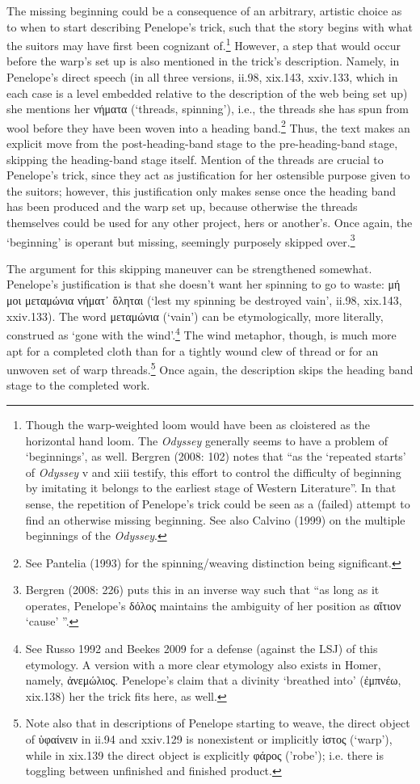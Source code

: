\documentclass[12pt]{article}
\begin{document}
The missing beginning could be a consequence of an arbitrary, artistic choice as to when to start describing Penelope's trick, such that the story begins with what the suitors may have first been cognizant of.\footnote{ Though the warp-weighted loom would have been as cloistered as the horizontal hand loom. The \textit{Odyssey} generally seems to have a problem of `beginnings', as well. Bergren (2008: 102) notes that ``as the `repeated starts' of \textit{Odyssey} v and xiii testify, this effort to control the difficulty of beginning by imitating it belongs to the earliest stage of Western Literature''. In that sense, the repetition of Penelope's trick could be seen as a (failed) attempt to find an otherwise missing beginning. See also Calvino (1999) on the multiple beginnings of the \textit{Odyssey}.} However, a step that would occur before the warp's set up is also mentioned in the trick's description. Namely, in Penelope's direct speech (in all three versions, ii.98, xix.143, xxiv.133, which in each case is a level embedded relative to the description of the web being set up) she mentions her νήματα (`threads, spinning'), i.e., the threads she has spun from wool before they have been woven into a heading band.\footnote{ See Pantelia (1993) for the spinning/weaving distinction being significant.} Thus, the text makes an explicit move from the post-heading-band stage to the pre-heading-band stage, skipping the heading-band stage itself. Mention of the threads are crucial to Penelope's trick, since they act as justification for her ostensible purpose given to the suitors; however, this justification only makes sense once the heading band has been produced and the warp set up, because otherwise the threads themselves could be used for any other project, hers or another's. Once again, the `beginning' is operant but missing, seemingly purposely skipped over.\footnote{ Bergren (2008: 226) puts this in an inverse way such that ``as long as it operates, Penelope's δόλος maintains the ambiguity of her position as αἴτιον `cause' ''.} 

The argument for this skipping maneuver can be strengthened somewhat. Penelope's justification is that she doesn't want her spinning to go to waste: μή μοι μεταμώνια νήματ᾿ ὄληται (`lest my spinning be destroyed vain', ii.98, xix.143, xxiv.133). The word μεταμώνια (`vain') can be etymologically, more literally, construed as `gone with the wind'.\footnote{ See Russo 1992 and Beekes 2009 for a defense (against the LSJ) of this etymology. A version with a more clear etymology also exists in Homer, namely, ἀνεμώλιος. Penelope's claim that a divinity `breathed into' (ἐμπνέω, xix.138) her the trick fits here, as well.} The wind metaphor, though, is much more apt for a completed cloth than for a tightly wound clew of thread or for an unwoven set of warp threads.\footnote{ Note also that in descriptions of Penelope starting to weave, the direct object of ὑφαίνειν in ii.94 and xxiv.129 is nonexistent or implicitly ἱστος (`warp'), while in xix.139 the direct object is explicitly φάρος ('robe'); i.e. there is toggling between unfinished and finished product.} Once again, the description skips the heading band stage to the completed work.
\end{document}
